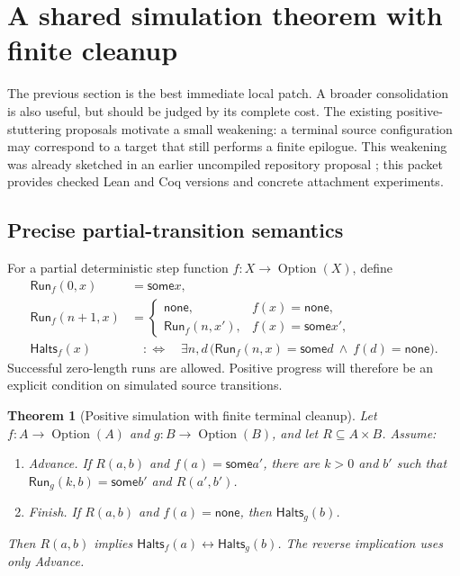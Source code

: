 \documentclass[11pt,letterpaper]{article}
\newcommand{\Halts}{\mathsf{Halts}}
\newcommand{\Run}{\mathsf{Run}}
\newcommand{\Some}{\mathsf{some}}
\newcommand{\None}{\mathsf{none}}
\newtheorem{theorem}{Theorem}[section]
\begin{document}
\section{A shared simulation theorem with finite cleanup}

The previous section is the best immediate local patch. A broader consolidation is
also useful, but should be judged by its complete cost. The existing positive-stuttering
proposals motivate a small weakening: a terminal source configuration may correspond
to a target that still performs a finite epilogue. This weakening was already sketched
in an earlier uncompiled repository proposal \cite{terminalprior}; this packet provides
checked Lean and Coq versions and concrete attachment experiments.

\subsection{Precise partial-transition semantics}

For a partial deterministic step function $f:X\to\operatorname{Option}(X)$, define
\[
\begin{aligned}
 \Run_f(0,x)&=\Some x,\\
 \Run_f(n+1,x)&=
 \begin{cases}
   \None,&f(x)=\None,\\
   \Run_f(n,x'),&f(x)=\Some x',
 \end{cases}\\
 \Halts_f(x)&\quad:\Longleftrightarrow\quad
   \exists n,d\,\bigl(\Run_f(n,x)=\Some d\ \wedge\ f(d)=\None\bigr).
\end{aligned}
\]
Successful zero-length runs are allowed. Positive progress will therefore be an
explicit condition on simulated source transitions.

\begin{theorem}[Positive simulation with finite terminal cleanup]
Let $f:A\to\operatorname{Option}(A)$ and
$g:B\to\operatorname{Option}(B)$, and let $R\subseteq A\times B$.
Assume:
\begin{enumerate}[label=(\roman*)]
\item \emph{Advance.} If $R(a,b)$ and $f(a)=\Some a'$, there are $k>0$ and $b'$
such that $\Run_g(k,b)=\Some b'$ and $R(a',b')$.
\item \emph{Finish.} If $R(a,b)$ and $f(a)=\None$, then $\Halts_g(b)$.
\end{enumerate}
Then $R(a,b)$ implies $\Halts_f(a)\leftrightarrow\Halts_g(b)$.
The reverse implication uses only \emph{Advance}.
\end{theorem}
\end{document}
